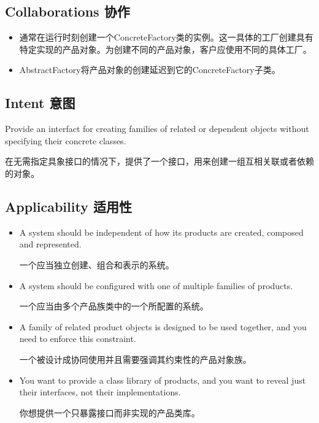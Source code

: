 \subsection{Collaborations 协作}

\begin{itemize}
\item 通常在运行时刻创建一个ConcreteFactory类的实例。这一具体的工厂创建具有特定实现的产品对象。为创建不同的产品对象，客户应使用不同的具体工厂。

\item AbstractFactory将产品对象的创建延迟到它的ConcreteFactory子类。 
\end{itemize}

\subsection{Intent 意图} 

Provide an interfact for creating families of related or dependent objects without specifying their concrete classes.

在无需指定具象接口的情况下，提供了一个接口，用来创建一组互相关联或者依赖的对象。

\subsection{Applicability 适用性}

\begin{itemize}
\item A system should be independent of how its products are created, composed and represented.

      一个应当独立创建、组合和表示的系统。

\item A system should be configured with one of multiple families of products.

      一个应当由多个产品族类中的一个所配置的系统。

\item A family of related product objects is designed to be used together, and you need to enforce this constraint.

      一个被设计成协同使用并且需要强调其约束性的产品对象族。

\item You want to provide a class library of products, and you want to reveal just their interfaces, not their implementations.

      你想提供一个只暴露接口而非实现的产品类库。
\end{itemize}

